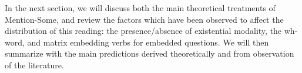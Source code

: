 \documentclass[12pt,letterpaper,table,svgnames,dvipsnames]{article}
\newcommand{\jd}[1]{\textcolor{Purple}{[jd: #1]}}
\newcommand{\whq}{\emph{wh}-question~}
\begin{document}








In the next section, we will discuss both the main theoretical treatments of Mention-Some, and review the factors which have been observed to affect the distribution of this reading: the presence/absence of existential modality, the wh-word, and matrix embedding verbs for embedded questions. We will then summarize with the main predictions derived theoretically and from observation of the literature. 
\end{document}
